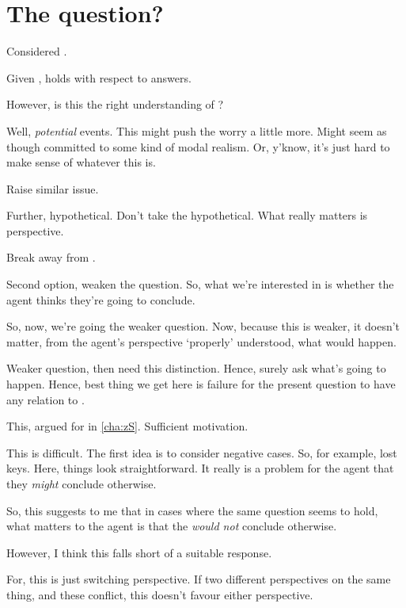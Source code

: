\section{The question?}
\label{cha:zSpA:sec:ptivity-question}

\begin{note}
  Considered \ptivity{}.

  Given \qzS{}, \ptivity{} holds with respect to answers.

  However, is this the right understanding of \qzS{}?
\end{note}

\begin{note}
  Well, \emph{potential} events.
  This might push the worry a little more.
  Might seem as though committed to some kind of modal realism.
  Or, y'know, it's just hard to make sense of whatever this is.
\end{note}

\begin{note}
  Raise similar issue.

  Further, hypothetical.
  Don't take the hypothetical.
  What really matters is perspective.
\end{note}

\begin{note}
  Break \qzS{} away from \qWhy{}.
\end{note}

\begin{note}
  Second option, weaken the question.
  So, what we're interested in is whether the agent thinks they're going to conclude.

  So, now, we're going the weaker question.
  Now, because this is weaker, it doesn't matter, from the agent's perspective `properly' understood, what would happen.

  Weaker question, then need this distinction.
  Hence, surely ask what's going to happen.
  Hence, best thing we get here is failure for the present question to have any relation to \qWhy{}.

  This, argued for in \autoref{cha:zS}.
  Sufficient motivation.
\end{note}

\begin{note}
  This is difficult.
  The first idea is to consider negative cases.
  So, for example, lost keys.
  Here, things look straightforward.
  It really is a problem for the agent that they \emph{might} conclude otherwise.

  So, this suggests to me that in cases where the same question seems to hold, what matters to the agent is that the \emph{would not} conclude otherwise.

  However, I think this falls short of a suitable response.

  For, this is just switching perspective.
  If two different perspectives on the same thing, and these conflict, this doesn't favour either perspective.
\end{note}

